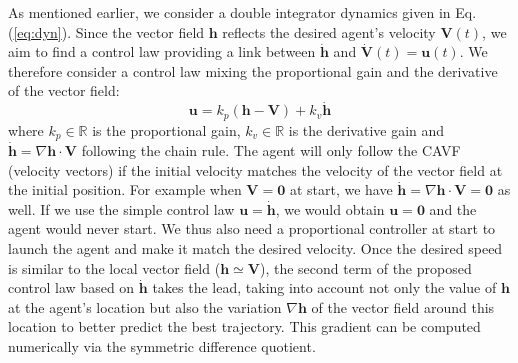 As mentioned earlier, we consider a double integrator dynamics given in Eq. (\ref{eq:dyn}).
Since the vector field $\bm{h}$ reflects the desired agent's velocity $\bm{V}(t)$, we aim to find a control law providing a link between $\dot{\bm{h}}$ and $\dot{\bm{V}}(t) = \bm{u}(t)$. We therefore consider a control law mixing the proportional gain and the derivative of the vector field:
\[
\bm{u} = k_p (\bm{h}-\bm{V}) + k_v \dot{\bm{h}}
\]
where $k_p \in \mathbb{R}$ is the proportional gain, $k_v \in \mathbb{R}$ is the derivative gain and $\dot{\bm{h}} = \nabla \bm{h} \cdot \bm{V}$ following the chain rule.
The agent will only follow the CAVF (velocity vectors) if the initial velocity matches the velocity of the vector field at the initial position. For example when $\bm{V} = \bm{0}$ at start, we have $\dot{\bm{h}} = \nabla \bm{h} \cdot \bm{V} = \bm{0}$ as well. If we use the simple control law $\bm{u} = \dot{\bm{h}}$, we would obtain $\bm{u} = \bm{0}$ and the agent would never start. We thus also need a proportional controller at start to launch the agent and make it match the desired velocity. Once the desired speed is similar to the local vector field ($\bm{h} \simeq \bm{V}$), the second term of the proposed control law based on $\dot{\bm{h}}$ takes the lead, taking into account not only the value of $\bm{h}$ at the agent’s location but also the variation $\nabla \bm{h}$ of the vector field around this location to better predict the best trajectory. This gradient can be computed numerically via the symmetric difference quotient.

